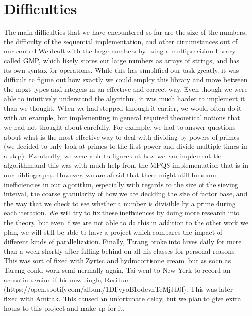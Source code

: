 \documentclass[11pt]{article}
\begin{document}
\section {Difficulties}
The main difficulties that we have encountered so far are the size of the numbers, the difficulty of the sequential implementation, and other circumstances out of our control.We dealt with the large numbers by using a multiprecision library called GMP, which likely stores our large numbers as arrays of strings, and has its own syntax for operations. While this has simplified our task greatly, it was difficult to figure out how exactly we could employ this library and move between the mpzt types and integers in an effective and correct way. Even though we were able to intuitively understand the algorithm, it was much harder to implement it than we thought. When we had stepped through it earlier, we would often do it with an example, but implementing in general required theoretical notions that we had not thought about carefully. For example, we had to answer questions about what is the most effective way to deal with dividing by powers of primes (we decided to only look at primes to the first power and divide multiple times in a step). Eventually, we were able to figure out how we can implement the algorithm,and this was with much help from the MPQS implementation that is in our bibliography. However, we are afraid that there might still be some inefficiencies in our algorithm, especially with regards to the size of the sieving interval, the coarse granularity of how we are deciding the size of factor base, and the way that we check to see whether a number is divisible by a prime during each iteration. We will try to fix these inefficiences by doing more research into the theory, but even if we are not able to do this in addition to the other work we plan, we will still be able to have a project which compares the impact of different kinds of parallelization. Finally, Tarang broke into hives daily for more than a week shortly after falling behind on all his classes for personal reasons. This was sort of fixed with Zyrtec and hydrocortisone cream, but as soon as Tarang could work semi-normally again, Tai went to New York to record an acoustic version if his new single, Residue (https://open.spotify.com/album/1DIjvyoB1odcvnTeMjJh0f). This was later fixed with Amtrak. This caused an unfortunate delay, but we plan to give extra hours to this project and make up for it. 
\end{document}
